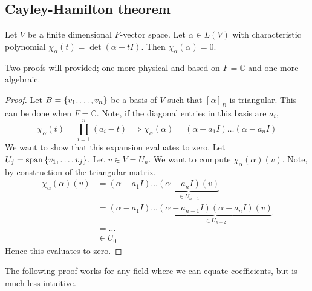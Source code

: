 \subsection{Cayley-Hamilton theorem}
\begin{theorem}
	Let \( V \) be a finite dimensional \( F \)-vector space.
	Let \( \alpha \in L(V) \) with characteristic polynomial \( \chi_\alpha(t) = \det(\alpha - t I) \).
	Then \( \chi_\alpha(\alpha) = 0 \).
\end{theorem}
\noindent Two proofs will provided; one more physical and based on \( F = \mathbb C \) and one more algebraic.
\begin{proof}
	Let \( B = \qty{v_1, \dots, v_n} \) be a basis of \( V \) such that \( [\alpha]_B \) is triangular.
	This can be done when \( F = \mathbb C \).
	Note, if the diagonal entries in this basis are \( a_i \),
	\[
		\chi_\alpha(t) = \prod_{i=1}^n (a_i - t) \implies \chi_\alpha(\alpha) = (\alpha - a_1 I) \dots (\alpha - a_n I)
	\]
	We want to show that this expansion evaluates to zero.
	Let \( U_j = \operatorname{span} \qty{v_1, \dots, v_j} \).
	Let \( v \in V = U_n \).
	We want to compute \( \chi_\alpha(\alpha)(v) \).
	Note, by construction of the triangular matrix.
	\begin{align*}
		\chi_\alpha(\alpha)(v) & = (\alpha - a_1 I) \dots \underbrace{(\alpha - a_n I)(v)}_{\in U_{n-1}}                     \\
		                       & = (\alpha - a_1 I) \dots \underbrace{(\alpha - a_{n-1} I)(\alpha - a_n I)(v)}_{\in U_{n-2}} \\
		                       & = \dots                                                                                     \\
		                       & \in U_0
	\end{align*}
	Hence this evaluates to zero.
\end{proof}
\noindent The following proof works for any field where we can equate coefficients, but is much less intuitive.
